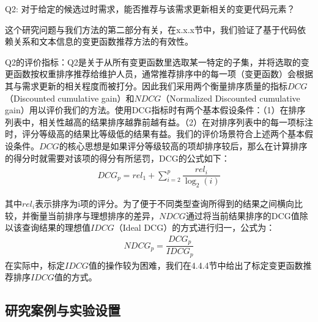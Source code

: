 Q2: 对于给定的候选过时需求，能否推荐与该需求更新相关的变更代码元素？

这个研究问题与我们方法的第二部分有关，在x.x.x节中，我们验证了基于代码依赖关系和文本信息的变更函数推荐方法的有效性。

Q2的评价指标：Q2是关于从所有变更函数里选取某一特定的子集，并将选取的变更函数按权重排序推荐给维护人员，通常推荐排序中的每一项（变更函数）会根据其与需求更新的相关程度而被打分。因此我们采用两个衡量排序质量的指标$DCG$（Discounted cumulative gain）和$NDCG$（Normalized Discounted cumulative gain）用以评价我们的方法。使用DCG指标时有两个基本假设条件：（1）在排序列表中，相关性越高的结果排序越靠前越有益。（2）在对排序列表中的每一项标注时，评分等级高的结果比等级低的结果有益。我们的评价场景符合上述两个基本假设条件。$DCG$的核心思想是如果评分等级较高的项却排序较后，那么在计算排序的得分时就需要对该项的得分有所惩罚，DCG的公式如下：
\begin{align}
DCG_{p}=rel_{1}+ \sum _{i=2}^{p}\dfrac {rel_{i}} {\log _{2}\left( i\right) }
\end{align}

其中$rel_{i}$表示排序为i项的评分。为了便于不同类型查询所得到的结果之间横向比较，并衡量当前排序与理想排序的差异，$NDCG$通过将当前结果排序的DCG值除以该查询结果的理想值$IDCG$（Ideal DCG）的方式进行归一，公式为：
\begin{align}
NDCG_{p}=\dfrac {DCG_{p}} {IDCG_{p}}
\end{align}
在实际中，标定$IDCG$值的操作较为困难，我们在4.4.4节中给出了标定变更函数推荐排序$IDCG$值的方式。


\subsection{研究案例与实验设置}

